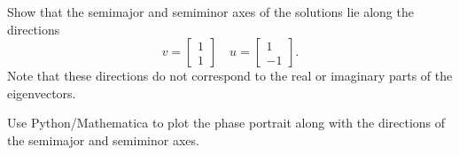 \documentclass[12pt,letterpaper]{exam}
\begin{document}
\begin{questions}
\begin{parts}
 Show that the semimajor and semiminor axes of the solutions lie along the directions
	\[v=\left[\begin{array}{c}
	1\\
	1
	\end{array}\right]
	\quad
	u=\left[\begin{array}{c}
	1\\
	-1
	\end{array}\right].\]
	Note that these directions do not correspond to the real or imaginary parts of the eigenvectors.
	\item Use Python/Mathematica to plot the phase portrait along with the directions of the semimajor and semiminor axes.
	\end{parts}






 

 \end{questions}
\end{document}
